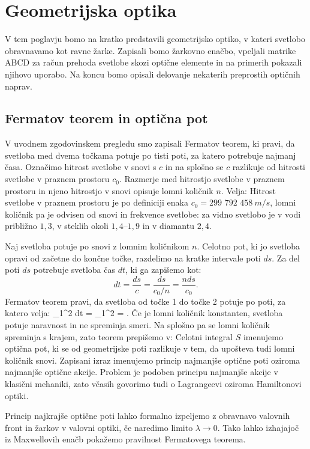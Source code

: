 
\chapter{Geometrijska optika}
V tem poglavju bomo na kratko predstavili geometrijsko optiko,
v kateri svetlobo obravnavamo kot ravne žarke. Zapisali bomo
žarkovno enačbo, vpeljali matrike ABCD za račun prehoda svetlobe
skozi optične elemente in na
primerih pokazali njihovo uporabo. Na koncu bomo opisali 
delovanje nekaterih preprostih optičnih naprav. 

\section{Fermatov teorem in optična pot}
V uvodnem zgodovinskem pregledu smo zapisali Fermatov teorem, 
ki pravi, da svetloba med dvema točkama potuje po tisti poti, 
za katero potrebuje najmanj časa. Označimo
hitrost svetlobe v snovi s $c$ in na splošno se  $c$ razlikuje
od hitrosti svetlobe v praznem prostoru $c_0$. Razmerje med
hitrostjo svetlobe v praznem prostoru in njeno hitrostjo
v snovi opisuje lomni količnik $n$. Velja:
Hitrost svetlobe v praznem prostoru je
po definiciji enaka $c_0 = 299\,\,792\,\,458~\si{m/s}$, 
lomni količnik pa je odvisen od snovi in frekvence svetlobe: za vidno svetlobo
je v vodi približno $1,3$, v steklih okoli $1,4$--$1,9$ in v diamantu $2,4$.

Naj svetloba potuje po snovi z lomnim količnikom $n$. Celotno pot, ki 
jo svetloba opravi od začetne do končne točke, razdelimo na kratke intervale 
poti $ds$. Za del poti $ds$ potrebuje svetloba čas $dt$, ki ga zapišemo kot:
\begin{equation}
 dt = \frac{ds}{c} = \frac{ds}{c_0/n} = \frac{nds}{c_0}.
\label{eq:02_02}
\end{equation}
Fermatov teorem pravi, da svetloba od točke 1 do točke 2 potuje po poti, za katero velja:
\beq
\int_1^2 dt = \int_1^2  = .
\label{eq:02_03}
\eeq
Če je lomni količnik konstanten, svetloba potuje naravnost in 
ne spreminja smeri. Na splošno pa se lomni količnik spreminja s 
krajem, zato teorem prepišemo v:
Celotni integral $S$ imenujemo optična pot, ki se od geometrijske poti razlikuje v tem,
da upošteva tudi lomni količnik snovi. 
Zapisani izraz imenujemo princip najmanjše optične poti oziroma najmanjše optične akcije. 
Problem je podoben principu najmanjše akcije v klasični mehaniki, zato včasih govorimo  
tudi o Lagrangeevi oziroma Hamiltonovi optiki.
\begin{remark}
Princip najkrajše optične poti lahko formalno izpeljemo z 
obravnavo valovnih front in žarkov v valovni optiki, če naredimo limito $\lambda \to 0$.
Tako lahko izhajajoč iz Maxwellovih enačb pokažemo pravilnost Fermatovega teorema.
\end{remark}

